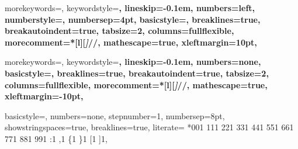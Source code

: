 \makeatletter
\global\let\tikz@ensure@dollar@catcode=\relax
\makeatother


{
  morekeywords={},
  keywordstyle=\bfseries,
  lineskip=-0.1em,
  numbers=left, %
  numberstyle=\jnumberstyle,
  numbersep=4pt,
  basicstyle=\jbasicstyle,
  breaklines=true,
  breakautoindent=true,
  tabsize=2,
  columns=fullflexible,
  morecomment=*[l][\textsl]{//},
  mathescape=true,
  xleftmargin=10pt,
}

{
  morekeywords={},
  keywordstyle=\bfseries,
  lineskip=-0.1em,
  numbers=none,
  basicstyle=\jbasicstyle,
  breaklines=true,
  breakautoindent=true,
  tabsize=2,
  columns=fullflexible,
  morecomment=*[l][\textsl]{//},
  mathescape=true,
  xleftmargin=-10pt,
}

{
  basicstyle=\normalfont\ttfamily,
  numbers=none,
  stepnumber=1,
  numbersep=8pt,
  showstringspaces=true,
  breaklines=true,
  literate=
    *{0}{{{\color{numb}0}}}{1}
     {1}{{{\color{numb}1}}}{1}
     {2}{{{\color{numb}2}}}{1}
     {3}{{{\color{numb}3}}}{1}
     {4}{{{\color{numb}4}}}{1}
     {5}{{{\color{numb}5}}}{1}
     {6}{{{\color{numb}6}}}{1}
     {7}{{{\color{numb}7}}}{1}
     {8}{{{\color{numb}8}}}{1}
     {9}{{{\color{numb}9}}}{1}
     {:}{{{\color{punct}{:}}}}{1}
     {,}{{{\color{punct}{,}}}}{1}
     {\{}{{{\color{delim}{\{}}}}{1}
     {\}}{{{\color{delim}{\}}}}}{1}
     {[}{{{\color{delim}{[}}}}{1}
     {]}{{{\color{delim}{]}}}}{1},
}


\newcommand{\JsonIn}[1]{{\lstinline[language=json-pretty, basicstyle=\small\ttfamily]@#1@}}

